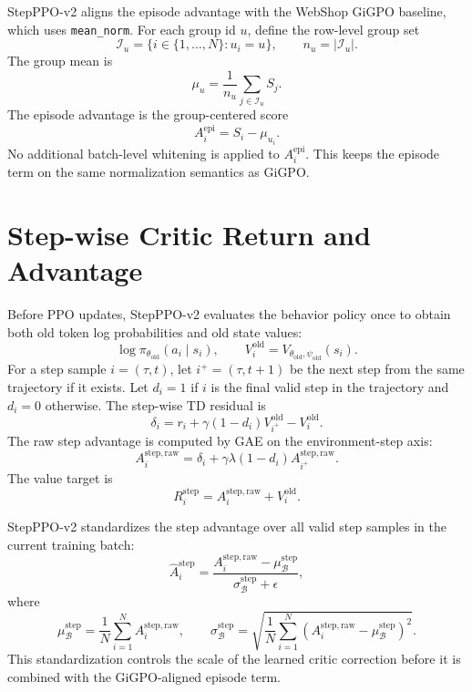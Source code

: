 \documentclass[10pt]{article}
\begin{document}
StepPPO-v2 aligns the episode advantage with the WebShop GiGPO baseline, which uses \texttt{mean\_norm}. For each group id $u$, define the row-level group set
\begin{equation}
\mathcal I_u=\{i\in\{1,\ldots,N\}:u_i=u\},
\qquad
n_u=|\mathcal I_u|.
\end{equation}
The group mean is
\begin{equation}
\mu_u=\frac{1}{n_u}\sum_{j\in\mathcal I_u}S_j.
\end{equation}
The episode advantage is the group-centered score
\begin{equation}
A_i^{\mathrm{epi}}=S_i-\mu_{u_i}.
\end{equation}
No additional batch-level whitening is applied to $A_i^{\mathrm{epi}}$. This keeps the episode term on the same normalization semantics as GiGPO.

\section{Step-wise Critic Return and Advantage}
Before PPO updates, StepPPO-v2 evaluates the behavior policy once to obtain both old token log probabilities and old state values:
\begin{equation}
\log\pi_{\theta_{\mathrm{old}}}(a_i\mid s_i),
\qquad
V_i^{\mathrm{old}}=V_{\theta_{\mathrm{old}},\psi_{\mathrm{old}}}(s_i).
\end{equation}
For a step sample $i=(\tau,t)$, let $i^+=(\tau,t+1)$ be the next step from the same trajectory if it exists. Let $d_i=1$ if $i$ is the final valid step in the trajectory and $d_i=0$ otherwise. The step-wise TD residual is
\begin{equation}
\delta_i=r_i+\gamma(1-d_i)V_{i^+}^{\mathrm{old}}-V_i^{\mathrm{old}}.
\end{equation}
The raw step advantage is computed by GAE on the environment-step axis:
\begin{equation}
A_i^{\mathrm{step,raw}}
=
\delta_i+
\gamma\lambda(1-d_i)A_{i^+}^{\mathrm{step,raw}}.
\end{equation}
The value target is
\begin{equation}
R_i^{\mathrm{step}}=A_i^{\mathrm{step,raw}}+V_i^{\mathrm{old}}.
\end{equation}

StepPPO-v2 standardizes the step advantage over all valid step samples in the current training batch:
\begin{equation}
\widehat A_i^{\mathrm{step}}
=
\frac{A_i^{\mathrm{step,raw}}-\mu_{\mathcal B}^{\mathrm{step}}}
{\sigma_{\mathcal B}^{\mathrm{step}}+\epsilon},
\end{equation}
where
\begin{equation}
\mu_{\mathcal B}^{\mathrm{step}}
=\frac{1}{N}\sum_{i=1}^{N}A_i^{\mathrm{step,raw}},
\qquad
\sigma_{\mathcal B}^{\mathrm{step}}
=\sqrt{\frac{1}{N}\sum_{i=1}^{N}(A_i^{\mathrm{step,raw}}-\mu_{\mathcal B}^{\mathrm{step}})^2}.
\end{equation}
This standardization controls the scale of the learned critic correction before it is combined with the GiGPO-aligned episode term.
\end{document}
